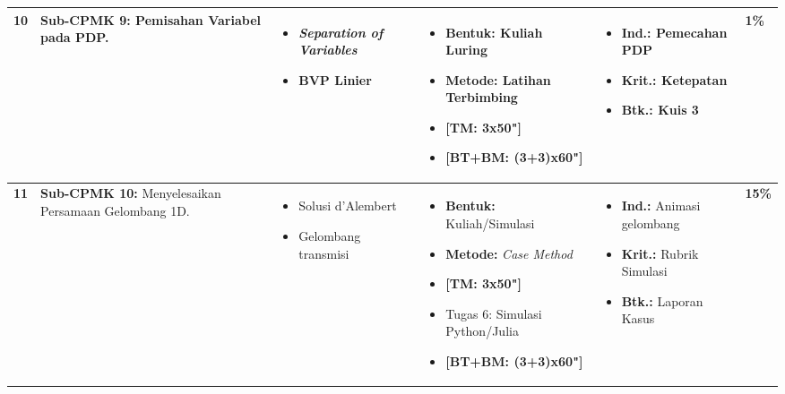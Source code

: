 \documentclass[11pt,a4paper]{article}
\begin{document}
\begin{longtable}{|C{0.6cm}|L{4.2cm}|L{4.5cm}|L{4.5cm}|L{3.5cm}|C{1.1cm}|}
\textbf{10} & \textbf{Sub-CPMK 9:} Pemisahan Variabel pada PDP. & \vspace{-4mm} \begin{itemize}[leftmargin=*, noitemsep] \item \textit{Separation of Variables} \item BVP Linier \end{itemize} \vspace{-4mm} & \vspace{-4mm} \begin{itemize}[leftmargin=*, noitemsep] \item \textbf{Bentuk:} Kuliah Luring \item \textbf{Metode:} Latihan Terbimbing \item \textbf{[TM: 3x50"]} \item \textbf{[BT+BM: (3+3)x60"]} \end{itemize} \vspace{-4mm} & \vspace{-4mm} \begin{itemize}[leftmargin=*, noitemsep] \item \textbf{Ind.:} Pemecahan PDP \item \textbf{Krit.:} Ketepatan \item \textbf{Btk.:} Kuis 3 \end{itemize} \vspace{-4mm} & \textbf{1\%} \\ \hline

\textbf{11} & \textbf{Sub-CPMK 10:} Menyelesaikan Persamaan Gelombang 1D. & \vspace{-4mm} \begin{itemize}[leftmargin=*, noitemsep] \item Solusi d'Alembert \item Gelombang transmisi \end{itemize} \vspace{-4mm} & \vspace{-4mm} \begin{itemize}[leftmargin=*, noitemsep] \item \textbf{Bentuk:} Kuliah/Simulasi \item \textbf{Metode:} \textit{Case Method} \item \textbf{[TM: 3x50"]} \item Tugas 6: Simulasi Python/Julia \item \textbf{[BT+BM: (3+3)x60"]} \end{itemize} \vspace{-4mm} & \vspace{-4mm} \begin{itemize}[leftmargin=*, noitemsep] \item \textbf{Ind.:} Animasi gelombang \item \textbf{Krit.:} Rubrik Simulasi \item \textbf{Btk.:} Laporan Kasus \end{itemize} \vspace{-4mm} & \textbf{15\%} \\ \hline


\end{longtable}
\end{document}
